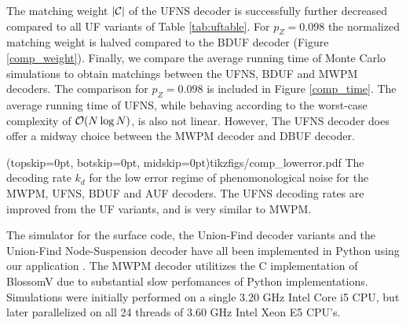 The matching weight $\lvert\mathcal{C}\rvert$ of the UFNS decoder is successfully further decreased compared to all UF variants of Table \ref{tab:uftable}. For $p_Z = 0.098$ the normalized matching weight is halved compared to the BDUF decoder (Figure \ref{comp_weight}). Finally, we compare the average running time of Monte Carlo simulations to obtain matchings between the UFNS, BDUF and MWPM decoders. The comparison for $p_Z=0.098$ is included in Figure \ref{comp_time}. The average running time of UFNS, while behaving according to the worst-case complexity of $\mathcal{O}(N \log{N})$, is also not linear. However, The UFNS decoder does offer a midway choice between the MWPM decoder and DBUF decoder. 

\Figure[htb](topskip=0pt, botskip=0pt, midskip=0pt){tikzfigs/comp_lowerror.pdf}{
  The decoding rate $k_d$ for the low error regime of phenomonological noise for the MWPM, UFNS, BDUF and AUF decoders. The UFNS decoding rates are improved from the UF variants, and is very similar to MWPM. \label{comp_lowerror}}


\par

The simulator for the surface code, the Union-Find decoder variants and the Union-Find Node-Suspension decoder have all been implemented in Python using our application \cite{OpenSurfaceSim}. The MWPM decoder utilitizes the C implementation of BlossomV \cite{kolmogorov2009blossom} due to substantial slow perfomances of Python implementations. Simulations were initially performed on a single 3.20 GHz Intel Core i5 CPU, but later parallelized on all 24 threads of 3.60 GHz Intel Xeon E5 CPU's. 